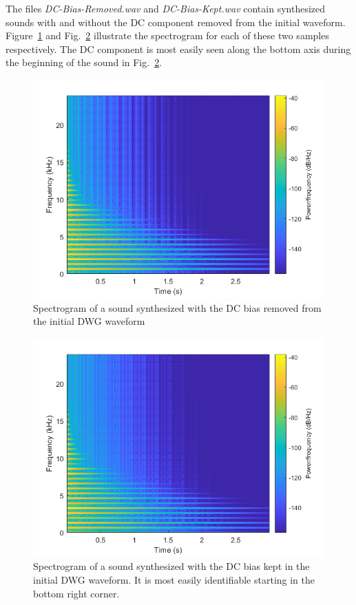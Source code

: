 \documentclass[../main.tex]{subfiles}
\begin{document}
The files \emph{DC-Bias-Removed.wav} and \emph{DC-Bias-Kept.wav} contain synthesized sounds with and without the DC component removed from the initial waveform. Figure~\ref{fig:DCBiasRemoved} and Fig.~\ref{fig:DCBiasKept} illustrate the spectrogram for each of these two samples respectively. The DC component is most easily seen along the bottom axis during the beginning of the sound in Fig.~\ref{fig:DCBiasKept}.

\begin{figure}[h]
    \centering
    \includegraphics[scale=.65]{./images/plots/DCBiasRemoved.png}
    \caption{Spectrogram of a sound synthesized with the DC bias removed from the initial DWG waveform}
    \label{fig:DCBiasRemoved}
\end{figure}

\begin{figure}[h]
    \centering
    \includegraphics[scale=.65]{./images/plots/DCBiasKept.png}
    \caption{Spectrogram of a sound synthesized with the DC bias kept in the initial DWG waveform. It is most easily identifiable starting in the bottom right corner.}
    \label{fig:DCBiasKept}
\end{figure}
\end{document}
